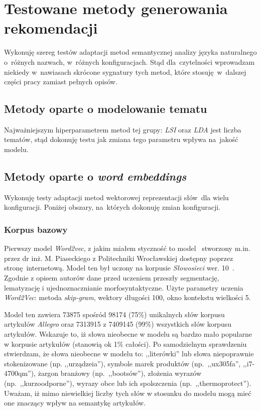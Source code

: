 \documentclass[pl]{minipw} %
\begin{document}
\section{Testowane metody generowania rekomendacji}

Wykonuję szereg testów adaptacji metod semantycznej analizy języka naturalnego o~różnych nazwach, w~różnych konfiguracjach. Stąd dla~czytelności wprowadzam niekiedy w~nawiasach skrócone sygnatury tych metod, które stosuję w~dalszej części pracy zamiast pełnych opisów.

\subsection{Metody oparte o modelowanie tematu}

Najważniejszym hiperparametrem metod tej grupy: \textit{LSI} oraz \textit{LDA} jest liczba tematów, stąd dokonuję testu jak zmiana tego parametru wpływa na~jakość modelu.

\subsection{Metody oparte o \textit{word embeddings}}
Wykonuję testy adaptacji metod wektorowej reprezentacji słów~dla wielu konfiguracji. Poniżej obszary, na~których dokonuję zmian konfiguracji.

\subsubsection{Korpus bazowy}

Pierwszy model \textit{Word2vec}, z jakim miałem styczność to model~\cite{pias} stworzony m.in. przez dr inż. M. Piaseckiego z Politechniki Wrocławskiej dostępny poprzez stronę internetową. Model ten był uczony na korpusie \textit{Słowosieci} wer. 10~\cite{wordnet}. Zgodnie z opisem autorów dane przed uczeniem  przeszły segmentację, lematyzację i ujednoznacznianie morfosyntaktyczne. Użyte parametry uczenia \textit{Word2Vec}: metoda \textit{skip-gram}, wektory długości 100, okno kontekstu wielkości 5.

Model ten zawiera 73875 spośród 98174 (75\%) unikalnych słów korpusu artykułów \textit{Allegro} oraz 7313915 z 7409145 (99\%) wszystkich słów korpusu artykułów. Wskazuje to, iż słowa nieobecne w modelu są bardzo mało popularne w korpusie artykułów (stanowią ok 1\% całości). Po samodzielnym sprawdzeniu stwierdzam, że słowa nieobecne w modelu to: ,,literówki'' lub słowa niepoprawnie stokenizowane (np. ,,urządzeia''), symbole marek produktów (np.~,,ux305fa'', ,,i7-4700qm''), żargon branżowy (np.~,,bootsów''), złożenia wyrazów (np.~,,kurzoodporne''), wyrazy obce lub ich spolszczenia (np.~,,thermoprotect''). Uważam, iż mimo niewielkiej liczby tych słów w stosunku do modelu mogą mieć one znaczący wpływ na semantykę artykułów.
\end{document}
